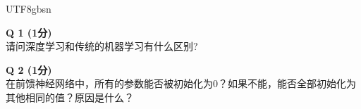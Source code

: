 \documentclass[a4paper, 11pt]{article}
\newenvironment{problem}[2][Q]
    { \begin{mdframed}[backgroundcolor=gray!20] \textbf{#1 #2} \\}
    {  \end{mdframed}}
\begin{document}
\begin{CJK}{UTF8}{gbsn}


\begin{problem}{1 (1分)}
请问深度学习和传统的机器学习有什么区别?
\end{problem}


\begin{problem}{2 (1分)}
在前馈神经网络中，所有的参数能否被初始化为0？如果不能，能否全部初始化为其他相同的值？原因是什么？

\end{problem}





\end{CJK}
\end{document}

